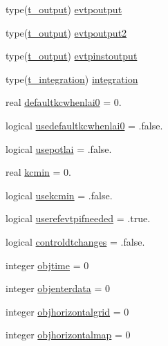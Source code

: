 \begin{DoxyCompactItemize}
\item 
type(\mbox{\hyperlink{structmodulebasin_1_1t__output}{t\+\_\+output}}) \mbox{\hyperlink{structmodulebasin_1_1t__basin_afff9f2fd34ce3089e2a5be10153d1892}{evtpoutput}}
\item 
type(\mbox{\hyperlink{structmodulebasin_1_1t__output}{t\+\_\+output}}) \mbox{\hyperlink{structmodulebasin_1_1t__basin_ad9b065cd969ac9929b326bea68e2658e}{evtpoutput2}}
\item 
type(\mbox{\hyperlink{structmodulebasin_1_1t__output}{t\+\_\+output}}) \mbox{\hyperlink{structmodulebasin_1_1t__basin_ad4f11d294d2b66dbf35ab9f0cedbcc88}{evtpinstoutput}}
\item 
type(\mbox{\hyperlink{structmodulebasin_1_1t__integration}{t\+\_\+integration}}) \mbox{\hyperlink{structmodulebasin_1_1t__basin_a7fc20da39943d3730a4d84a09da89131}{integration}}
\item 
real \mbox{\hyperlink{structmodulebasin_1_1t__basin_a8dcb0c8c4620c993a83030bb208bd9c4}{defaultkcwhenlai0}} = 0.
\item 
logical \mbox{\hyperlink{structmodulebasin_1_1t__basin_a13f38f7af2dc8235dcdab66638b942fd}{usedefaultkcwhenlai0}} = .false.
\item 
logical \mbox{\hyperlink{structmodulebasin_1_1t__basin_a77177117f28d0a3ffa181635b20789af}{usepotlai}} = .false.
\item 
real \mbox{\hyperlink{structmodulebasin_1_1t__basin_a1754a1baadb1fd53c0dc39797009c1c2}{kcmin}} = 0.
\item 
logical \mbox{\hyperlink{structmodulebasin_1_1t__basin_a7aaf244e006322fe377fe095335ead96}{usekcmin}} = .false.
\item 
logical \mbox{\hyperlink{structmodulebasin_1_1t__basin_a037a62a241f73c325dc2c35b232d9421}{userefevtpifneeded}} = .true.
\item 
logical \mbox{\hyperlink{structmodulebasin_1_1t__basin_a680c0afac09199615074add29dac65fa}{controldtchanges}} = .false.
\item 
integer \mbox{\hyperlink{structmodulebasin_1_1t__basin_a229352da7f94d8893cda50e13c8206fb}{objtime}} = 0
\item 
integer \mbox{\hyperlink{structmodulebasin_1_1t__basin_a7f6f4bf6f847a002a8d32f6bd75a0f71}{objenterdata}} = 0
\item 
integer \mbox{\hyperlink{structmodulebasin_1_1t__basin_ac81237072761a0dbdc476fa6fc4117ee}{objhorizontalgrid}} = 0
\item 
integer \mbox{\hyperlink{structmodulebasin_1_1t__basin_ae29f486a15c89875ec2cee02cdbc8176}{objhorizontalmap}} = 0

\end{DoxyCompactItemize}
